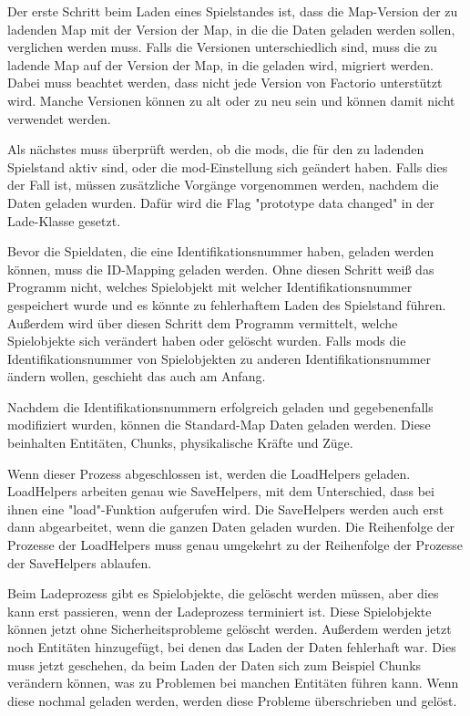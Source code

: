Der erste Schritt beim Laden eines Spielstandes ist, dass die Map-Version der zu ladenden Map mit der Version der Map, in die die Daten geladen werden sollen, verglichen werden muss. Falls die Versionen unterschiedlich sind, muss die zu ladende Map auf der Version der Map, in die geladen wird, migriert werden. Dabei muss beachtet werden, dass nicht jede Version von Factorio unterstützt wird. Manche Versionen können zu alt oder zu neu sein und können damit nicht verwendet werden.\cite{factorioGithubSaveLoad}

Als nächstes muss überprüft werden, ob die \acp{mod}, die für den zu ladenden Spielstand aktiv sind, oder die \ac{mod}-Einstellung sich geändert haben. Falls dies der Fall ist, müssen zusätzliche Vorgänge vorgenommen werden, nachdem die Daten geladen wurden. Dafür wird die Flag "prototype data changed" in der Lade-Klasse gesetzt.\cite{factorioGithubSaveLoad}

Bevor die Spieldaten, die eine Identifikationsnummer haben, geladen werden können, muss die ID-Mapping geladen werden. Ohne diesen Schritt weiß das Programm nicht, welches Spielobjekt mit welcher Identifikationsnummer gespeichert wurde und es könnte zu fehlerhaftem Laden des Spielstand führen. Außerdem wird über diesen Schritt dem Programm vermittelt, welche Spielobjekte sich verändert haben oder gelöscht wurden. Falls \acp{mod} die Identifikationsnummer von Spielobjekten zu anderen Identifikationsnummer ändern wollen, geschieht das auch am Anfang.\cite{factorioGithubSaveLoad}

Nachdem die Identifikationsnummern erfolgreich geladen und gegebenenfalls modifiziert wurden, können die Standard-Map Daten geladen werden. Diese beinhalten Entitäten, Chunks, physikalische Kräfte und Züge.\cite{factorioGithubSaveLoad}

Wenn dieser Prozess abgeschlossen ist, werden die LoadHelpers geladen. LoadHelpers arbeiten genau wie SaveHelpers, mit dem Unterschied, dass bei ihnen eine "load"-Funktion aufgerufen wird. Die SaveHelpers werden auch erst dann abgearbeitet, wenn die ganzen Daten geladen wurden. Die Reihenfolge der Prozesse der LoadHelpers muss genau umgekehrt zu der Reihenfolge der Prozesse der SaveHelpers ablaufen.\cite{factorioGithubSaveLoad}

Beim Ladeprozess gibt es Spielobjekte, die gelöscht werden müssen, aber dies kann erst passieren, wenn der Ladeprozess terminiert ist. Diese Spielobjekte können jetzt ohne Sicherheitsprobleme gelöscht werden. Außerdem werden jetzt noch Entitäten hinzugefügt, bei denen das Laden der Daten fehlerhaft war. Dies muss jetzt geschehen, da beim Laden der Daten sich zum Beispiel Chunks verändern können, was zu Problemen bei manchen Entitäten führen kann. Wenn diese nochmal geladen werden, werden diese Probleme überschrieben und gelöst.\cite{factorioGithubSaveLoad}

